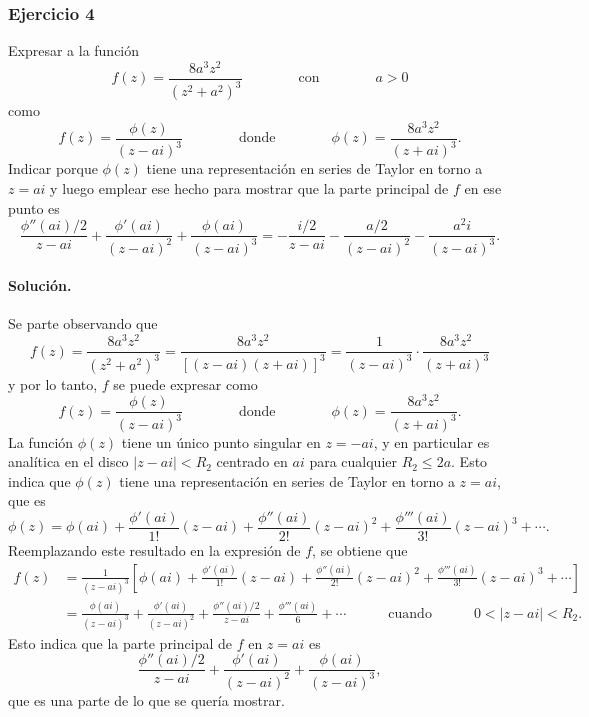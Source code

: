\documentclass[a4paper]{report}
\begin{document}
\subsubsection*{Ejercicio 4}

Expresar a la función 
\[
 f(z)=\frac{8a^3z^2}{(z^2+a^2)^3}
 \qquad\qquad\textrm{con}\qquad\qquad
 a>0
\]
como 
\[
 f(z)=\frac{\phi(z)}{(z-ai)^3}
 \qquad\qquad\textrm{donde}\qquad\qquad
 \phi(z)=\frac{8a^3z^2}{(z+ai)^3}.
\]
Indicar porque \(\phi(z)\) tiene una representación en series de Taylor en torno a \(z=ai\) y luego emplear ese hecho para mostrar que la parte principal de \(f\) en ese punto es
\[
 \frac{\phi''(ai)/2}{z-ai}+\frac{\phi'(ai)}{(z-ai)^2}+\frac{\phi(ai)}{(z-ai)^3}=
 -\frac{i/2}{z-ai}-\frac{a/2}{(z-ai)^2}-\frac{a^2i}{(z-ai)^3}.
\]

\paragraph{Solución.} Se parte observando que 
\[
 f(z)=\frac{8a^3z^2}{(z^2+a^2)^3}=\frac{8a^3z^2}{[(z-ai)(z+ai)]^3}=\frac{1}{(z-ai)^3}\cdot\frac{8a^3z^2}{(z+ai)^3}
\]
y por lo tanto, \(f\) se puede expresar como
\[
 f(z)=\frac{\phi(z)}{(z-ai)^3}
 \qquad\qquad\textrm{donde}\qquad\qquad
 \phi(z)=\frac{8a^3z^2}{(z+ai)^3}.
\]
La función \(\phi(z)\) tiene un único punto singular en \(z=-ai\), y en particular es analítica en el disco \(|z-ai|<R_2\) centrado en \(ai\) para cualquier \(R_2\leq2a\). Esto indica que \(\phi(z)\) tiene una representación en series de Taylor en torno a \(z=ai\), que es
\[
 \phi(z)=\phi(ai)+\frac{\phi'(ai)}{1!}(z-ai)+\frac{\phi''(ai)}{2!}(z-ai)^2+\frac{\phi'''(ai)}{3!}(z-ai)^3+\cdots.
\]
Reemplazando este resultado en la expresión de \(f\), se obtiene que 
\begin{align*}
 f(z)&=\frac{1}{(z-ai)^3}\left[\phi(ai)+\frac{\phi'(ai)}{1!}(z-ai)+\frac{\phi''(ai)}{2!}(z-ai)^2+\frac{\phi'''(ai)}{3!}(z-ai)^3+\cdots\right]\\ 
 &=\frac{\phi(ai)}{(z-ai)^3}+\frac{\phi'(ai)}{(z-ai)^2}+\frac{\phi''(ai)/2}{z-ai}+\frac{\phi'''(ai)}{6}+\cdots
 \qquad\quad\textrm{cuando}\quad\qquad
  0<|z-ai|<R_2.
\end{align*}
Esto indica que la parte principal de \(f\) en \(z=ai\) es 
\begin{equation}\label{eq:exercise_79_04_principal_part}
 \frac{\phi''(ai)/2}{z-ai}+\frac{\phi'(ai)}{(z-ai)^2}+\frac{\phi(ai)}{(z-ai)^3}, 
\end{equation}
que es una parte de lo que se quería mostrar. 
\end{document}

